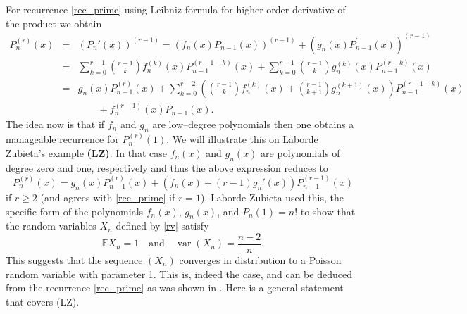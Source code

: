 \documentclass[10pt]{amsart}
\numberwithin{subcase}{case}
\begin{document}
 For  recurrence  \eqref{rec_prime} using Leibniz  formula for higher order derivative of the product we obtain
\begin{eqnarray*}
P_n^{(r)}(x)&=&\left(P_n'(x)\right)^{(r-1)}=\left(f_n(x)P_{n-1}(x)\right)^{(r-1)}+\left(g_n(x)P_{n-1}^{'}(x)\right)^{(r-1)}\\&=&
\sum_{k=0}^{r-1}{r-1\choose k}f_n^{(k)}(x)P_{n-1}^{(r-1-k)}(x)+
\sum_{k=0}^{r-1}{r-1\choose k}g_n^{(k)}(x)P_{n-1}^{(r-k)}(x)\\&=&
g_n(x)P_{n-1}^{(r)}(x)+\sum_{k=0}^{r-2}\left({r-1\choose k}f_n^{(k)}(x)+{r-1\choose k+1}g_n^{(k+1)}(x)\right)P_{n-1}^{(r-1-k)}(x)\\&&\qquad +f_n^{(r-1)}(x)P_{n-1}(x).
\end{eqnarray*}
The idea now is that  if $f_n$ and $g_n$ are low--degree polynomials  then one obtains a manageable  recurrence for $P_n^{(r)}(1)$. We will illustrate this on Laborde Zubieta's example {\bf(LZ)}. 
In that case $f_n(x)$ and $g_n(x)$ are  polynomials of degree zero and one, respectively and thus the above expression reduces to 
\begin{equation}\label{red_diff}P_n^{(r)}(x)=g_n(x)P_{n-1}^{(r)}(x)+\left(f_n(x)+(r-1)g_n'(x)\right)P_{n-1}^{(r-1)}(x)
\end{equation}
if $r\ge2$ (and agrees with \eqref{rec_prime} if $r=1$).
 Laborde Zubieta used this, the specific form of the polynomials $f_n(x)$, $g_n(x)$, and $P_n(1)=n!$ to show that the random variables $X_n$ defined by \eqref{rv}
 satisfy
 \[{\mathbb{E}} X_n=1\quad\mbox{and}\quad{\operatorname{var}}(X_n)=\frac{n-2}n.\]   
This  suggests that the sequence $(X_n)$ converges in distribution to a Poisson random variable with parameter 1. This is, indeed the case, and can be deduced from the recurrence \eqref{rec_prime} as was shown in \cite{HL}.  Here is a general  statement that covers (LZ).
\end{document}

